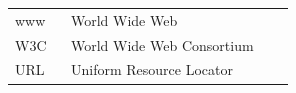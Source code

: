 \documentclass[a4paper,bibtotoc,oneside]{scrbook}
\begin{document}


\hspace{-17mm}\begin{tabular}{>{\raggedleft}p{0.2\linewidth} p{0.75\linewidth} p{0.1\linewidth}}
www & World Wide Web \\
W3C & World Wide Web Consortium\\
URL & Uniform Resource Locator
\end{tabular}


\end{document}

